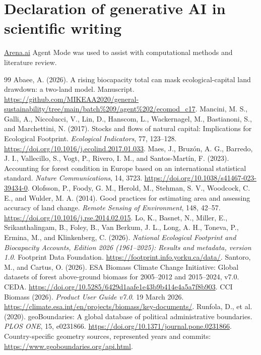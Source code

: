 \documentclass[11pt,a4paper]{article}
\begin{document}
\section*{Declaration of generative AI in scientific writing}
\href{http://Arena.ai}{Arena.ai} Agent Mode was used to assist with computational methods and literature review.

\begin{thebibliography}{99}
 Abaee, A. (2026). A rising biocapacity total can mask ecological-capital land drawdown: a two-land model. Manuscript. \url{https://github.com/MIKEAA2020/general-sustainability/tree/main/batch%209/agent%202/ecomod_c17}.
 Mancini, M. S., Galli, A., Niccolucci, V., Lin, D., Hanscom, L., Wackernagel, M., Bastianoni, S., and Marchettini, N. (2017). Stocks and flows of natural capital: Implications for Ecological Footprint. \emph{Ecological Indicators}, 77, 123--128. \url{https://doi.org/10.1016/j.ecolind.2017.01.033}.
 Maes, J., Bruz\'on, A. G., Barredo, J. I., Vallecillo, S., Vogt, P., Rivero, I. M., and Santos-Mart\'in, F. (2023). Accounting for forest condition in Europe based on an international statistical standard. \emph{Nature Communications}, 14, 3723. \url{https://doi.org/10.1038/s41467-023-39434-0}.
 Olofsson, P., Foody, G. M., Herold, M., Stehman, S. V., Woodcock, C. E., and Wulder, M. A. (2014). Good practices for estimating area and assessing accuracy of land change. \emph{Remote Sensing of Environment}, 148, 42--57. \url{https://doi.org/10.1016/j.rse.2014.02.015}.
 Lo, K., Basnet, N., Miller, E., Srikanthalingam, B., Foley, B., Van Berkum, J. L., Long, A. H., Toneva, P., Ermina, M., and Klinkenberg, C. (2026). \emph{National Ecological Footprint and Biocapacity Accounts, Edition 2026 (1961--2025): Results and metadata, version 1.0}. Footprint Data Foundation. \url{https://footprint.info.yorku.ca/data/}.
 Santoro, M., and Cartus, O. (2026). ESA Biomass Climate Change Initiative: Global datasets of forest above-ground biomass for 2005--2012 and 2015--2024, v7.0. CEDA. \url{https://doi.org/10.5285/6429d1aafe1e43b9b414e4a5a7f8b903}.
 CCI Biomass (2026). \emph{Product User Guide v7.0}. 19 March 2026. \url{https://climate.esa.int/en/projects/biomass/key-documents/}.
 Runfola, D., et al. (2020). geoBoundaries: A global database of political administrative boundaries. \emph{PLOS ONE}, 15, e0231866. \url{https://doi.org/10.1371/journal.pone.0231866}. Country-specific geometry sources, represented years and commits: \url{https://www.geoboundaries.org/api.html}.

\end{thebibliography}
\end{document}
